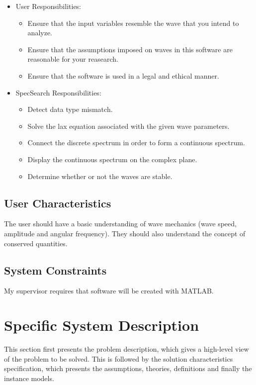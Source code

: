 \documentclass[12pt]{article}
\begin{document}
\begin{itemize}
\item User Responsibilities:
\begin{itemize}
\item Ensure that the input variables resemble the wave that you intend 
to analyze.
\item Ensure that the assumptions imposed on waves in this software are 
reasonable 
for your reasearch.
\item Ensure that the software is used in a legal and ethical manner.

\end{itemize}
\item SpecSearch Responsibilities:

\begin{itemize}
\item Detect data type mismatch. 
\item Solve the lax equation associated with the given wave parameters. 
\item Connect the discrete spectrum in order to form a continuous spectrum. 
\item Display the continuous spectrum on the complex plane.
\item Determine whether or not the waves are stable. 
\end{itemize}
\end{itemize}

\subsection{User Characteristics} \label{SecUserCharacteristics}

The user should have a basic understanding of wave mechanics (wave 
speed, 
amplitude and angular frequency). They should also understand the concept of 
conserved quantities. 

\subsection{System Constraints}

My supervisor requires that software will be created with MATLAB.


\section{Specific System Description}

This section first presents the problem description, which gives a high-level
view of the problem to be solved.  This is followed by the solution 
characteristics specification, which presents the assumptions, theories, 
definitions and finally the instance models. 
\end{document}
